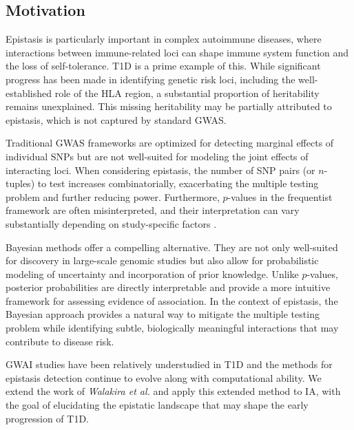 \documentclass{article}\usepackage[]{graphicx}\usepackage[]{color}
\begin{document}
\subsection{Motivation}
\label{sec:motiv}
Epistasis is particularly important in complex autoimmune diseases, where interactions between immune-related loci can shape immune system function and the loss of self-tolerance\cite{roseEpistasisImmunityRole2012}. T1D is a prime example of this.
While significant progress has been made in identifying genetic risk loci, including the well-established role of the HLA region, a substantial proportion of heritability remains unexplained\cite{onengut-gumuscuGeneticVariantsComplement2024}. This missing heritability may be partially attributed to epistasis, which is not captured by standard GWAS\cite{pangMissingHeritabilityType2022}.
\par
Traditional GWAS frameworks are optimized for detecting marginal effects of individual SNPs but are not well-suited for modeling the joint effects of interacting loci. When considering epistasis, the number of SNP pairs (or $n$-tuples) to test increases combinatorially, exacerbating the multiple testing problem and further reducing power. Furthermore, $p$-values in the frequentist framework are often misinterpreted, and their interpretation can vary substantially depending on study-specific factors \cite{lesaffreBayesianBiostatistics2012,walakiraDetectingGeneGene2022}.
\par
Bayesian methods offer a compelling alternative. They are not only well-suited for discovery in large-scale genomic studies but also allow for probabilistic modeling of uncertainty and incorporation of prior knowledge. Unlike $p$-values, posterior probabilities are directly interpretable and provide a more intuitive framework for assessing evidence of association. In the context of epistasis, the Bayesian approach provides a natural way to mitigate the multiple testing problem while identifying subtle, biologically meaningful interactions that may contribute to disease risk\cite{walakiraDetectingGeneGene2022}.
\par
GWAI studies have been relatively understudied in T1D and the methods for epistasis detection continue to evolve along with computational ability. We extend the work of \textit{Walakira et al.}\cite{walakiraDetectingGeneGene2022} and apply this extended method to IA, with the goal of elucidating the epistatic landscape that may shape the early progression of T1D.

\end{document}
